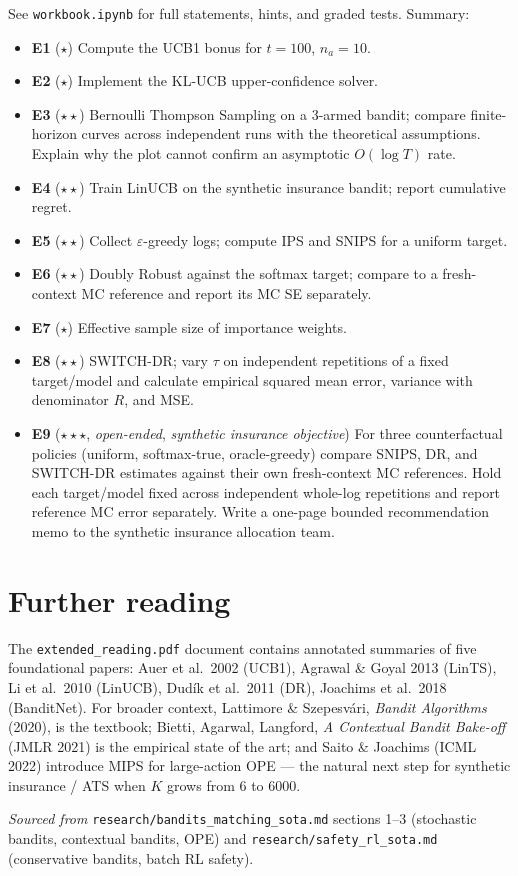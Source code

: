\documentclass[11pt,oneside]{scrbook}
\begin{document}
See \texttt{workbook.ipynb} for full statements, hints, and graded tests.
Summary:

\begin{itemize}\setlength\itemsep{2pt}
  \item \textbf{E1} ($\star$) Compute the UCB1 bonus for $t=100$, $n_a=10$.
  \item \textbf{E2} ($\star$) Implement the KL-UCB upper-confidence solver.
  \item \textbf{E3} ($\star\star$) Bernoulli Thompson Sampling on a 3-armed
        bandit; compare finite-horizon curves across independent runs with the
        theoretical assumptions. Explain why the plot cannot confirm an
        asymptotic $O(\log T)$ rate.
  \item \textbf{E4} ($\star\star$) Train LinUCB on the synthetic insurance bandit; report
        cumulative regret.
  \item \textbf{E5} ($\star\star$) Collect $\varepsilon$-greedy logs; compute
        IPS and SNIPS for a uniform target.
  \item \textbf{E6} ($\star\star$) Doubly Robust against the softmax target;
        compare to a fresh-context MC reference and report its MC SE separately.
  \item \textbf{E7} ($\star$) Effective sample size of importance weights.
  \item \textbf{E8} ($\star\star$) SWITCH-DR; vary $\tau$ on independent
        repetitions of a fixed target/model and calculate empirical squared
        mean error, variance with denominator $R$, and MSE.
  \item \textbf{E9} ($\star\star\star$, \emph{open-ended}, \emph{synthetic insurance objective}) For three counterfactual policies
        (uniform, softmax-true, oracle-greedy) compare SNIPS, DR, and
        SWITCH-DR estimates against their own fresh-context MC references.
        Hold each target/model fixed across independent whole-log repetitions
        and report reference MC error separately. Write a one-page bounded
        recommendation memo to the synthetic insurance allocation team.
\end{itemize}

\chapter{Further reading}

The \texttt{extended\_reading.pdf} document contains annotated summaries of
five foundational papers: Auer et al.\ 2002 (UCB1), Agrawal \& Goyal 2013
(LinTS), Li et al.\ 2010 (LinUCB), Dud\'ik et al.\ 2011 (DR), Joachims et
al.\ 2018 (BanditNet). For broader context, Lattimore \& Szepesv\'ari,
\emph{Bandit Algorithms} (2020), is the textbook; Bietti, Agarwal,
Langford, \emph{A Contextual Bandit Bake-off} (JMLR 2021) is the empirical
state of the art; and Saito \& Joachims (ICML 2022) introduce MIPS for
large-action OPE --- the natural next step for synthetic insurance / ATS when $K$ grows
from 6 to 6000.

\emph{Sourced from} \texttt{research/bandits\_matching\_sota.md} sections
1--3 (stochastic bandits, contextual bandits, OPE) and
\texttt{research/safety\_rl\_sota.md} (conservative bandits, batch RL safety).
\end{document}
